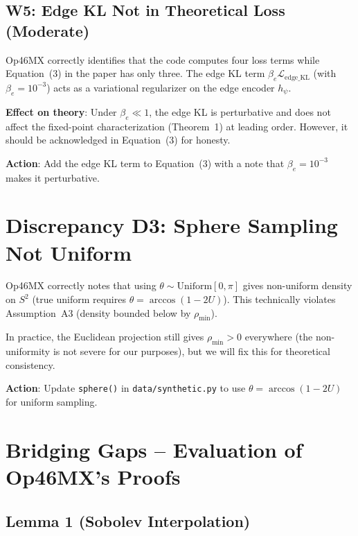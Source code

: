 \documentclass{article}
\begin{document}
\subsection{W5: Edge KL Not in Theoretical Loss (Moderate)}

\begin{accept}
Op46MX correctly identifies that the code computes four loss terms while
Equation~(3) in the paper has only three. The edge KL term
$\beta_e \mathcal{L}_{\mathrm{edge\_KL}}$ (with $\beta_e = 10^{-3}$) acts as
a variational regularizer on the edge encoder $h_\psi$.

\textbf{Effect on theory}: Under $\beta_e \ll 1$, the edge KL is perturbative
and does not affect the fixed-point characterization (Theorem~1) at leading
order. However, it should be acknowledged in Equation~(3) for honesty.

\textbf{Action}: Add the edge KL term to Equation~(3) with a note that
$\beta_e = 10^{-3}$ makes it perturbative.
\end{accept}

\section{Discrepancy D3: Sphere Sampling Not Uniform}

\begin{accept}
Op46MX correctly notes that using $\theta \sim \mathrm{Uniform}[0, \pi]$ gives
non-uniform density on $S^2$ (true uniform requires $\theta = \arccos(1-2U)$).
This technically violates Assumption~A3 (density bounded below by $\rho_{\min}$).

In practice, the Euclidean projection still gives $\rho_{\min} > 0$ everywhere
(the non-uniformity is not severe for our purposes), but we will fix this
for theoretical consistency.

\textbf{Action}: Update \texttt{sphere()} in \texttt{data/synthetic.py} to
use $\theta = \arccos(1-2U)$ for uniform sampling.
\end{accept}

\section{Bridging Gaps -- Evaluation of Op46MX's Proofs}

\subsection{Lemma 1 (Sobolev Interpolation)}
\end{document}
